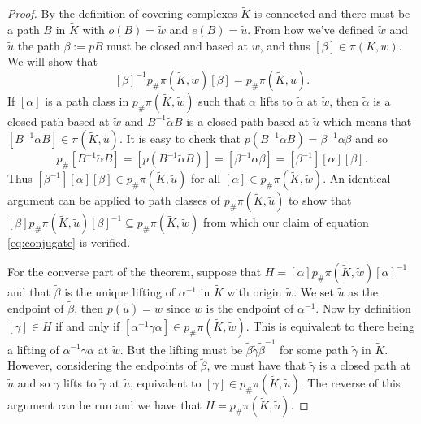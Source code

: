\documentclass[12pt]{article}
\theoremstyle{definition}
\numberwithin{equation}{theorem}
\begin{document}
\begin{proof}
  By the definition of covering complexes $\tilde{K}$ is connected and there must be a path $B$ in $\tilde{K}$ with $o(B) = \tilde{w}$ and $e(B) = \tilde{u}$. From how we've defined $\tilde{w}$ and $\tilde{u}$ the path $\beta:=pB$ must be closed and based at $w$, and thus $[\beta] \in \pi(K,w)$. We will show that
  \begin{equation}
    \label{eq:conjugate}
    [\beta]^{-1} p_{\#}\pi(\tilde{K},\tilde{w}) [\beta] = p_{\#}\pi(\tilde{K},\tilde{u}).
  \end{equation}
  If $[\alpha]$ is a path class in $p_{\#}\pi(\tilde{K},\tilde{w})$ such that $\alpha$ lifts to $\tilde{\alpha}$ at $\tilde{w}$, then $\tilde{\alpha}$ is a closed path based at $\tilde{w}$ and $B^{-1} \tilde{\alpha} B$ is a closed path based at $\tilde{u}$ which means that $[B^{-1} \tilde{\alpha} B] \in \pi(\tilde{K},\tilde{u})$. It is easy to check that $p(B^{-1} \tilde{\alpha} B) = \beta^{-1}\alpha\beta$ and so
  \begin{equation*}
    p_{\#}[B^{-1} \tilde{\alpha} B] = [p(B^{-1} \tilde{\alpha} B)] = [\beta^{-1}\alpha\beta] = [\beta^{-1}][\alpha][\beta].
  \end{equation*}
  Thus $[\beta^{-1}][\alpha][\beta] \in p_{\#}\pi(\tilde{K},\tilde{u})$ for all $[\alpha] \in p_{\#}\pi(\tilde{K},\tilde{w})$. An identical argument can be applied to path classes of $p_{\#}\pi(\tilde{K},\tilde{u})$ to show that $[\beta] p_{\#}\pi(\tilde{K},\tilde{u}) [\beta]^{-1} \subseteq p_{\#}\pi(\tilde{K},\tilde{w})$ from which our claim of equation \ref{eq:conjugate} is verified.

  For the converse part of the theorem, suppose that $H = [\alpha]p_{\#}\pi(\tilde{K},\tilde{w})[\alpha]^{-1}$ and that $\tilde{\beta}$ is  the unique lifting of $\alpha^{-1}$ in $\tilde{K}$ with origin $\tilde{w}$. We set $\tilde{u}$ as the endpoint of $\tilde{\beta}$, then $p(\tilde{u}) = w$ since $w$ is the endpoint of $\alpha^{-1}$. Now by definition $[\gamma] \in H$ if and only if $[\alpha^{-1}\gamma\alpha] \in p_{\#}\pi(\tilde{K},\tilde{w})$. This is equivalent to there being a lifting of $\alpha^{-1} \gamma \alpha$ at $\tilde{w}$. But the lifting must be $\tilde{\beta} \tilde{\gamma} \tilde{\beta}^{-1}$ for some path $\tilde{\gamma}$ in $\tilde{K}$. However, considering the endpoints of $\tilde{\beta}$, we must have that $\tilde{\gamma}$ is a closed path at $\tilde{u}$ and so $\gamma$ lifts to $\tilde{\gamma}$ at $\tilde{u}$, equivalent to $[\gamma] \in p_{\#}\pi(\tilde{K},\tilde{u})$. The reverse of this argument can be run and we have that $H = p_{\#}\pi(\tilde{K},\tilde{u})$.
\end{proof}
\end{document}
